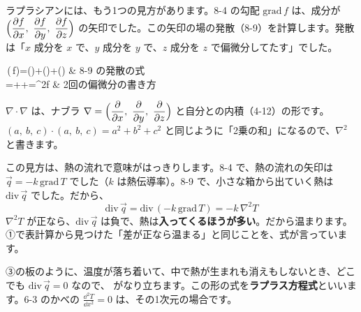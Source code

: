 ラプラシアンには、もう1つの見方があります。8-4 の勾配 $\mathrm{grad}\,f$ は、成分が $\Bigl(\dfrac{\partial f}{\partial x},\ \dfrac{\partial f}{\partial y},\ \dfrac{\partial f}{\partial z}\Bigr)$ の矢印でした。この矢印の場の発散（8-9）を計算します。発散は「$x$ 成分を $x$ で、$y$ 成分を $y$ で、$z$ 成分を $z$ で偏微分してたす」でした。
\begin{bkhenkei}[0.7]
\,(\,f)=\Bigl(\Bigr)+\Bigl(\Bigr)+\Bigl(\Bigr) & 8-9 の発散の式 \\
=++=\nabla^2f & 2回の偏微分の書き方 \\
\end{bkhenkei}
$\nabla\cdot\nabla$ は、ナブラ $\nabla=\Bigl(\dfrac{\partial}{\partial x},\ \dfrac{\partial}{\partial y},\ \dfrac{\partial}{\partial z}\Bigr)$ と自分との内積（4-12）の形です。$(a,\ b,\ c)\cdot(a,\ b,\ c)=a^2+b^2+c^2$ と同じように「2乗の和」になるので、$\nabla^2$ と書きます。

この見方は、熱の流れで意味がはっきりします。8-4 で、熱の流れの矢印は $\vec q=-k\,\mathrm{grad}\,T$ でした（$k$ は熱伝導率）。8-9 で、小さな箱から出ていく熱は $\mathrm{div}\,\vec q$ でした。だから、
\[ \mathrm{div}\,\vec q=\mathrm{div}\,(-k\,\mathrm{grad}\,T)=-k\,\nabla^2T \]
$\nabla^2T$ が正なら、$\mathrm{div}\,\vec q$ は負で、熱は\textbf{入ってくるほうが多い}。だから温まります。①で表計算から見つけた「差が正なら温まる」と同じことを、式が言っています。


\label{bk:8-12:houteishiki}③の板のように、温度が落ち着いて、中で熱が生まれも消えもしないとき、どこでも $\mathrm{div}\,\vec q=0$ なので、
がなり立ちます。この形の式を\textbf{ラプラス方程式}といいます。6-3 のかべの $\tfrac{\dd^2T}{\dd x^2}=0$ は、その1次元の場合です。

